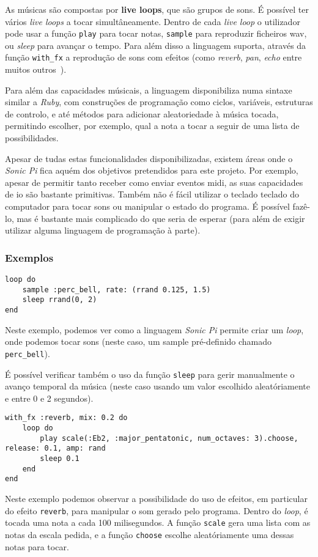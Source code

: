 As músicas são compostas por \textbf{live loops}, que são grupos de sons. É possível ter vários \textit{live loops} a tocar simultâneamente. Dentro de cada \textit{live loop} o utilizador pode usar a função \texttt{play} para tocar notas, \texttt{sample} para reproduzir ficheiros \acrshort{wav}, ou \textit{sleep} para avançar o tempo. Para além disso a linguagem suporta, através da função \texttt{with\_fx} a reprodução de sons com efeitos (como \textit{reverb}, \textit{pan}, \textit{echo} entre muitos outros~\cite{sonic-pi-fx}).

Para além das capacidades músicais, a linguagem disponibiliza numa sintaxe similar a \textit{Ruby}, com construções de programação como ciclos, variáveis, estruturas de controlo, e até métodos para adicionar aleatoriedade à música tocada, permitindo escolher, por exemplo, qual a nota a tocar a seguir de uma lista de possibilidades.

Apesar de tudas estas funcionalidades disponibilizadas, existem áreas onde o \textit{Sonic Pi} fica aquém dos objetivos pretendidos para este projeto. Por exemplo, apesar de permitir tanto receber como enviar eventos \acrshort{midi}, as suas capacidades de \acrfull{io} são bastante primitivas. Também não é fácil utilizar o teclado teclado do computador para tocar sons ou manipular o estado do programa. É possível fazê-lo, mas é bastante mais complicado do que seria de esperar (para além de exigir utilizar alguma linguagem de programação à parte).

\subsubsection{Exemplos}
\begin{lstlisting}[caption={Reproduzir um \textit{sample} com valores aleatórios}] 
loop do
    sample :perc_bell, rate: (rrand 0.125, 1.5)
    sleep rrand(0, 2)
end
\end{lstlisting}
Neste exemplo, podemos ver como a linguagem \textit{Sonic Pi} permite criar um \textit{loop}, onde podemos tocar sons (neste caso, um sample pré-definido chamado \texttt{perc\_bell}).

É possível verificar também o uso da função \texttt{sleep} para gerir manualmente o avanço temporal da música (neste caso usando um valor escolhido aleatóriamente e entre 0 e 2 segundos).


\begin{lstlisting}[caption={Reproduzir um notas de uma escala aleatórias, com efeito \textit{reverb}}] 
with_fx :reverb, mix: 0.2 do
    loop do
        play scale(:Eb2, :major_pentatonic, num_octaves: 3).choose, release: 0.1, amp: rand
        sleep 0.1
    end
end
\end{lstlisting}
Neste exemplo podemos observar a possibilidade do uso de efeitos, em particular do efeito \texttt{reverb}, para manipular o som gerado pelo programa. Dentro do \textit{loop}, é tocada uma nota a cada 100 milisegundos. A função \texttt{scale} gera uma lista com as notas da escala pedida, e a função \texttt{choose} escolhe aleatóriamente uma dessas notas para tocar.
    
